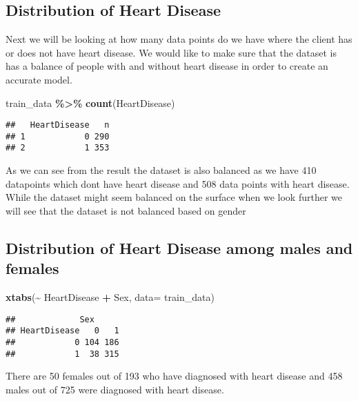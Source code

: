 \documentclass[
]{article}
\newenvironment{Shaded}{\begin{snugshade}}{\end{snugshade}}
\newcommand{\AttributeTok}[1]{\textcolor[rgb]{0.13,0.29,0.53}{#1}}
\newcommand{\FunctionTok}[1]{\textcolor[rgb]{0.13,0.29,0.53}{\textbf{#1}}}
\newcommand{\NormalTok}[1]{#1}
\newcommand{\SpecialCharTok}[1]{\textcolor[rgb]{0.81,0.36,0.00}{\textbf{#1}}}
\begin{document}
\subsection{Distribution of Heart
Disease}\label{distribution-of-heart-disease}

Next we will be looking at how many data points do we have where the
client has or does not have heart disease. We would like to make sure
that the dataset is has a balance of people with and without heart
disease in order to create an accurate model.

\begin{Shaded}
\begin{Highlighting}[]
\NormalTok{train\_data }\SpecialCharTok{\%\textgreater{}\%}
  \FunctionTok{count}\NormalTok{(HeartDisease)}
\end{Highlighting}
\end{Shaded}

\begin{verbatim}
##   HeartDisease   n
## 1            0 290
## 2            1 353
\end{verbatim}

As we can see from the result the dataset is also balanced as we have
410 datapoints which dont have heart disease and 508 data points with
heart disease. While the dataset might seem balanced on the surface when
we look further we will see that the dataset is not balanced based on
gender

\subsection{Distribution of Heart Disease among males and
females}\label{distribution-of-heart-disease-among-males-and-females}

\begin{Shaded}
\begin{Highlighting}[]
\FunctionTok{xtabs}\NormalTok{(}\SpecialCharTok{\textasciitilde{}}\NormalTok{ HeartDisease }\SpecialCharTok{+}\NormalTok{ Sex, }\AttributeTok{data=}\NormalTok{ train\_data)}
\end{Highlighting}
\end{Shaded}

\begin{verbatim}
##             Sex
## HeartDisease   0   1
##            0 104 186
##            1  38 315
\end{verbatim}

There are 50 females out of 193 who have diagnosed with heart disease
and 458 males out of 725 were diagnosed with heart disease.
\end{document}
